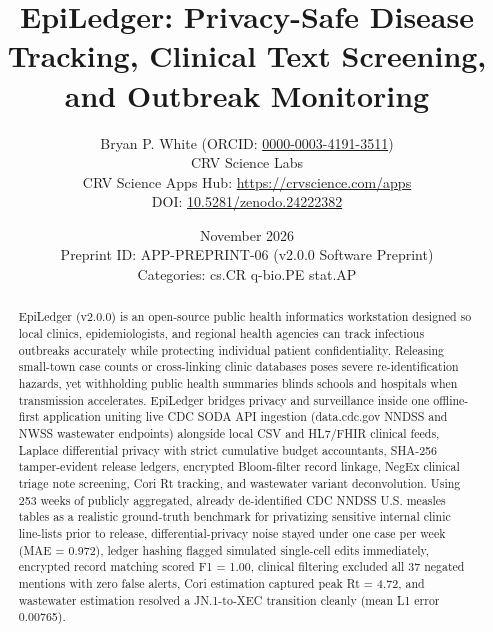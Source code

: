 \documentclass[10pt,letterpaper]{article}
\title{\textbf{EpiLedger: Privacy-Safe Disease Tracking, Clinical Text Screening, and Outbreak Monitoring}}
\author{Bryan P. White (ORCID: \href{https://orcid.org/0000-0003-4191-3511}{0000-0003-4191-3511}) \\ CRV Science Labs \\ \small CRV Science Apps Hub: \url{https://crvscience.com/apps} \\ \small DOI: \href{https://doi.org/10.5281/zenodo.24222382}{10.5281/zenodo.24222382}}
\date{November 2026 \\ \small Preprint ID: APP-PREPRINT-06 (v2.0.0 Software Preprint) \\ \small Categories: cs.CR \textbullet{} q-bio.PE \textbullet{} stat.AP}
\begin{document}
\maketitle

\begin{abstract}
EpiLedger (v2.0.0) is an open-source public health informatics workstation designed so local clinics, epidemiologists, and regional health agencies can track infectious outbreaks accurately while protecting individual patient confidentiality. Releasing small-town case counts or cross-linking clinic databases poses severe re-identification hazards, yet withholding public health summaries blinds schools and hospitals when transmission accelerates. EpiLedger bridges privacy and surveillance inside one offline-first application uniting live CDC SODA API ingestion (data.cdc.gov NNDSS and NWSS wastewater endpoints) alongside local CSV and HL7/FHIR clinical feeds, Laplace differential privacy with strict cumulative budget accountants, SHA-256 tamper-evident release ledgers, encrypted Bloom-filter record linkage, NegEx clinical triage note screening, Cori Rt tracking, and wastewater variant deconvolution. Using 253 weeks of publicly aggregated, already de-identified CDC NNDSS U.S. measles tables as a realistic ground-truth benchmark for privatizing sensitive internal clinic line-lists prior to release, differential-privacy noise stayed under one case per week (MAE = 0.972), ledger hashing flagged simulated single-cell edits immediately, encrypted record matching scored F1 = 1.00, clinical filtering excluded all 37 negated mentions with zero false alerts, Cori estimation captured peak Rt = 4.72, and wastewater estimation resolved a JN.1-to-XEC transition cleanly (mean L1 error 0.00765).
\end{abstract}
\end{document}
